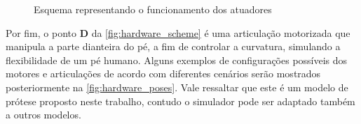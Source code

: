 \begin{figure}[ht]
	\caption{\label{fig:hardware_scheme}Esquema representando o funcionamento dos atuadores}
	\begin{center}
	\end{center}
\end{figure}

Por fim, o ponto \textbf{D} da \autoref{fig:hardware_scheme} é uma articulação motorizada que manipula a parte dianteira do pé, a fim de controlar a curvatura, simulando a flexibilidade de um pé humano. Alguns exemplos de configurações possíveis dos motores e articulações de acordo com diferentes cenários serão mostrados posteriormente na \autoref{fig:hardware_poses}. Vale ressaltar que este é um modelo de prótese proposto neste trabalho, contudo o simulador pode ser adaptado também a outros modelos.


% 
% 

